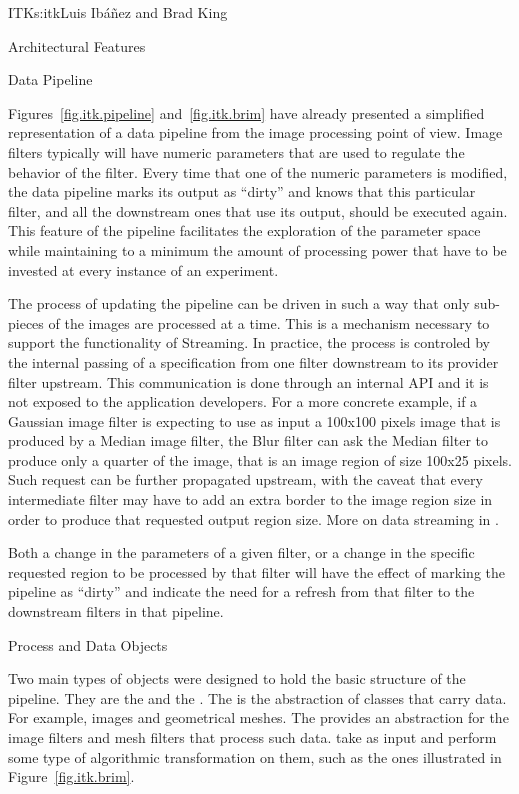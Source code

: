 \begin{aosachapter}{ITK}{s:itk}{Luis Ib\'{a}\~{n}ez and Brad King}
\begin{aosasect1}{Architectural Features}
\begin{aosasect2}{Data Pipeline}
\begin{aosaitemize}
\end{aosaitemize}

Figures~\ref{fig.itk.pipeline} and~\ref{fig.itk.brim} have already presented a
simplified representation of a data pipeline from the image processing point of
view. Image filters typically will have numeric parameters that are used to
regulate the behavior of the filter. Every time that one of the numeric
parameters is modified, the data pipeline marks its output as ``dirty'' and
knows that this particular filter, and all the downstream ones that use its
output, should be executed again. This feature of the pipeline facilitates the
exploration of the parameter space while maintaining to a minimum the amount of
processing power that have to be invested at every instance of an experiment.

The process of updating the pipeline can be driven in such a way that only
sub-pieces of the images are processed at a time. This is a mechanism necessary
to support the functionality of Streaming. In practice, the process is
controled by the internal passing of a  specification
from one filter downstream to its provider filter upstream. This communication
is done through an internal API and it is not exposed to the application
developers. For a more concrete example, if a Gaussian image filter is
expecting to use as input a 100x100 pixels image that is produced by a Median
image filter, the Blur filter can ask the Median filter to produce only a
quarter of the image, that is an image region of size 100x25 pixels.  Such
request can be further propagated upstream, with the caveat that every
intermediate filter may have to add an extra border to the image region size in
order to produce that requested output region size.
More on data streaming in .

Both a change in the parameters of a given filter, or a change in the
specific requested region to be processed by that filter will have the
effect of marking the pipeline as ``dirty'' and indicate the need for
a refresh from that filter to the downstream filters in that pipeline.

\begin{aosasect3}{Process and Data Objects}

Two main types of objects were designed to hold the basic structure of the
pipeline.  They are the  and the . The
 is the abstraction of classes that carry data. For example,
images and geometrical meshes. The  provides an abstraction
for the image filters and mesh filters that process such data.
 take  as input and perform some type of
algorithmic transformation on them, such as the ones illustrated in
Figure~\ref{fig.itk.brim}.


\end{aosasect3}
\end{aosasect2}
\end{aosasect1}
\end{aosachapter}
